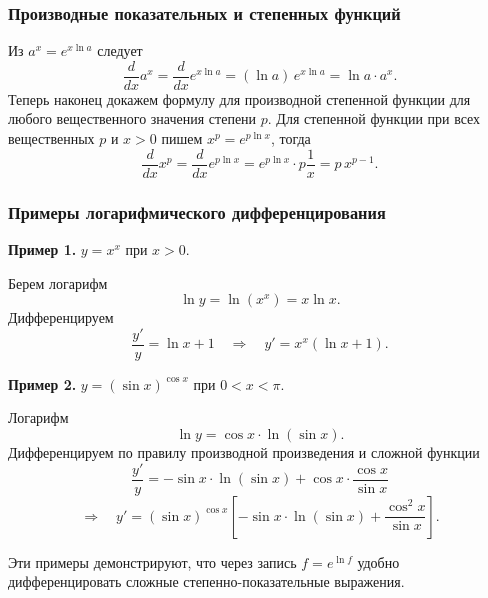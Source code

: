 \documentclass[12pt, a4paper]{article}%
\begin{document}
\subsubsection*{Производные показательных и степенных функций}
Из \(a^x=e^{x\ln a}\) следует
\[
\frac{d}{dx}a^x = \frac{d}{dx} e^{x\ln a} = (\ln a)\,e^{x\ln a} = \ln a\cdot a^x.
\]
Теперь наконец докажем формулу для производной степенной функции для любого вещественного значения степени $p$. Для степенной функции при всех вещественных \(p\) и \(x>0\) пишем \(x^p=e^{p\ln x}\), тогда
\[
\frac{d}{dx}x^p=\frac{d}{dx}e^{p\ln x}=e^{p\ln x}\cdot p\frac{1}{x}=p\,x^{p-1}.
\]

\subsubsection*{Примеры логарифмического дифференцирования}
\textbf{Пример 1. } \(y=x^x\) при \(x>0\).

Берем логарифм
\[
\ln y=\ln(x^x)=x\ln x.
\]
Дифференцируем
\[
\frac{y'}{y}=\ln x+1 \quad \Longrightarrow\quad \boxed{y'=x^x(\ln x+1).}
\]

\textbf{Пример 2. } \(y=(\sin x)^{\cos x}\) при \(0 < x < \pi\). 

Логарифм
\[
\ln y=\cos x\cdot \ln(\sin x).
\]
Дифференцируем по правилу производной произведения и сложной функции
\[
\frac{y'}{y}=-\sin x\cdot \ln(\sin x)+\cos x\cdot \frac{\cos x}{\sin x}
\]
\[
\Longrightarrow\quad
\boxed{y'=(\sin x)^{\cos x}\left[-\sin x\cdot \ln(\sin x)+\frac{\cos^2 x}{\sin x}\right].}
\]

Эти примеры демонстрируют, что через запись \(f=e^{\ln f}\) удобно дифференцировать сложные степенно-показательные выражения.
\end{document}
